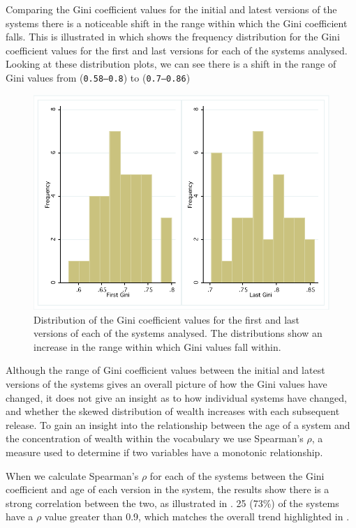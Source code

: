 Comparing the Gini coefficient values for the initial and latest versions of the systems there is a noticeable shift in the range within which the Gini coefficient falls. This is illustrated in  which shows the frequency distribution for the Gini coefficient values for the first and last versions for each of the systems analysed. Looking at these distribution plots, we can see there is a shift in the range of Gini values from (\texttt{0.58--0.8}) to (\texttt{0.7--0.86})

\begin{figure}[t]
\centering
\includegraphics[width=\textwidth]{Figures/Vocab-FirstLastGini.pdf}
\caption{Distribution of the Gini coefficient values for the first and last versions of each of the systems analysed. The distributions show an increase in the range within which Gini values fall within.}
\label{fig:vocab-firstlastgini-dist}
\end{figure}

Although the range of Gini coefficient values between the initial and latest versions of the systems gives an overall picture of how the Gini values have changed, it does not give an insight as to how individual systems have changed, and whether the skewed distribution of wealth increases with each subsequent release. To gain an insight into the relationship between the age of a system and the concentration of wealth within the vocabulary we use Spearman's $\rho$, a measure used to determine if two variables have a monotonic relationship.

When we calculate Spearman's $\rho$ for each of the systems between the Gini  coefficient and age of each version in the system, the results show there is a strong correlation between the two, as illustrated in . 25 (73\%) of the systems have a $\rho$ value greater than 0.9, which matches the overall trend highlighted in .

